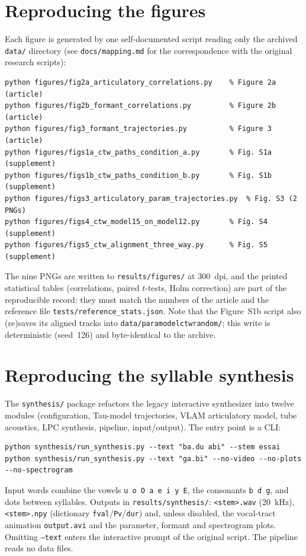 \documentclass[11pt,a4paper]{article}
\begin{document}
\section{Reproducing the figures}
Each figure is generated by one self-documented script reading only the
archived \texttt{data/} directory (see \texttt{docs/mapping.md} for the
correspondence with the original research scripts):
\begin{lstlisting}
python figures/fig2a_articulatory_correlations.py    % Figure 2a (article)
python figures/fig2b_formant_correlations.py         % Figure 2b (article)
python figures/fig3_formant_trajectories.py          % Figure 3  (article)
python figures/figs1a_ctw_paths_condition_a.py       % Fig. S1a  (supplement)
python figures/figs1b_ctw_paths_condition_b.py       % Fig. S1b  (supplement)
python figures/figs3_articulatory_param_trajectories.py  % Fig. S3 (2 PNGs)
python figures/figs4_ctw_model15_on_model12.py       % Fig. S4  (supplement)
python figures/figs5_ctw_alignment_three_way.py      % Fig. S5  (supplement)
\end{lstlisting}
The nine PNGs are written to \texttt{results/figures/} at 300~dpi, and
the printed statistical tables (correlations, paired $t$-tests, Holm
correction) are part of the reproducible record: they must match the
numbers of the article and the reference file
\texttt{tests/reference\_stats.json}. Note that the Figure~S1b script
also (re)saves its aligned tracks into
\texttt{data/paramodelctwrandom/}; this write is deterministic (seed~126)
and byte-identical to the archive.

\section{Reproducing the syllable synthesis}
The \texttt{synthesis/} package refactors the legacy interactive
synthesizer into twelve modules (configuration, Tau-model trajectories,
VLAM articulatory model, tube acoustics, LPC synthesis, pipeline,
input/output). The entry point is a CLI:
\begin{lstlisting}
python synthesis/run_synthesis.py --text "ba.du abi" --stem essai
python synthesis/run_synthesis.py --text "ga.bi" --no-video --no-plots --no-spectrogram
\end{lstlisting}
Input words combine the vowels \texttt{u o O a e i y E}, the consonants
\texttt{b d g}, and dots between syllables. Outputs in
\texttt{results/synthesis/}: \texttt{<stem>.wav} (20~kHz), \texttt{<stem>.npy}
(dictionary \texttt{fval}/\texttt{Pv}/\texttt{dur}) and, unless disabled,
the vocal-tract animation \texttt{output.avi} and the parameter, formant
and spectrogram plots. Omitting \texttt{--text} enters the interactive
prompt of the original script. The pipeline reads no data files.
\end{document}

